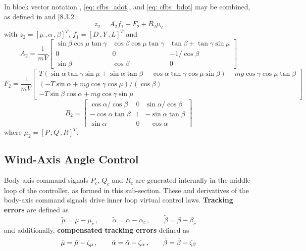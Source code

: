 \documentclass[12pt]{ucthesis}
\begin{document}
In block vector notation , \ref{eq: cfbs_adot}, and \ref{eq: cfbs_bdot} may be combined, as defined in \citet{Farrell2005} and \citet{Farrell2006}[8.3.2]:
	\begin{equation} \label{eq: cfbs_middle_blk_dyn}
		\dot{z}_2 = A_2 f_1  + F_2 + B_2\mu_2
	\end{equation}
with $z_2 = [\mu\,, \alpha\,, \beta]^T$, $f_1 = [D\,, Y\,, L]^T$  and
	\begin{equation} \label{eq: cfbs_middle_blk_dyn_A2}
		A_2 = \frac{1}{mV} \left[ \begin{array}{ccc} \sin\beta\cos\mu\tan\gamma & \cos\beta\cos\mu\tan\gamma & \tan\beta + \tan\gamma\sin\mu \\ 0 & 0 & -1 / \cos\beta \\ \sin\beta & \cos\beta & 0 \end{array} \right] 
	\end{equation}
	\footnotesize
	\begin{equation} \label{eq: cfbs_middle_blk_dyn_F2}
		F_2 = \frac{1}{mV} \left[ \begin{array}{c} T(\sin\alpha\tan\gamma\sin\mu + \sin\alpha\tan\beta - \cos\alpha\tan\gamma\cos\mu\sin\beta) - mg\cos\gamma\cos\mu\tan\beta \\ (-T\sin\alpha + mg\cos\gamma\cos\mu) / (\cos\beta) \\ -T\sin\beta\cos\alpha + mg\cos\gamma\sin\mu \end{array} \right] 
	\end{equation}
	\normalsize
	\begin{equation} \label{eq: cfbs_middle_blk_dyn_B2}
		B_2 = \left[ \begin{array}{ccc} \cos\alpha / \cos\beta & 0 & \sin\alpha / \cos\beta \\ -\cos\alpha\tan\beta & 1 & -\sin\alpha\tan\beta \\ \sin\alpha & 0 & -\cos\alpha \end{array} \right]
	\end{equation}
where $\mu_2 = [P\,, Q\,, R]^T$.

\newpage
\subsection{Wind-Axis Angle Control}
\label{subsec: uav_wind_axis}
%
Body-axis command signals $P_c$, $Q_c$ and $R_c$ are generated internally in the middle loop of the controller, as formed in this sub-section. These and derivatives of the body-axis command signals drive inner loop virtual control laws. \textbf{Tracking errors} are defined as
	\begin{equation} \label{eq: cfbs_etrk_middle_loop}
		\tilde{\mu}		= \mu		- \mu_c 	\,,\qquad
		\tilde{\alpha}	= \alpha	- \alpha_c 	\,,\qquad
		\tilde{\beta} 	= \beta 	- \beta_c
	\end{equation}
and additionally, \textbf{compensated tracking errors} defined as
	\begin{equation} \label{eq: cfbs_ecmp_middle_loop}
		\bar{\mu}		= \tilde{\mu}		- \zeta_\mu 	\,,\qquad
		\bar{\alpha}	= \tilde{\alpha}	- \zeta_\alpha 	\,,\qquad
		\bar{\beta} 	= \tilde{\beta} 	- \zeta_\beta
	\end{equation}
\end{document}
